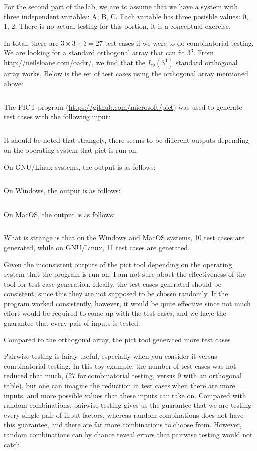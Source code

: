 For the second part of the lab, we are to assume that we have a system with
three independent variables: A, B, C. Each variable has three posisble values:
0, 1, 2. There is no actual testing for this portion, it is a conceptual
exercise.

In total, there are $3 \times 3 \times 3  = 27$ test cases if we were to do
combinatorial testing. We are looking for a standard orthogonal array that
can fit $3^3$. From \url{http://neilsloane.com/oadir/}, we find that
the $L_9(3^4)$ standard orthogonal array works. 
Below is the set of test cases using the orthogonal array mentioned above:

\inputminted{text}{resources/standard3^4}

The PICT program (\url{https://github.com/microsoft/pict}) was used to generate
test cases with the following input:

\inputminted{text}{resources/pict}

It should be noted that strangely, there seems to be different outputs
depending on the operating system that pict is run on.

On GNU/Linux systems, the output is as follows:
\inputminted{text}{resources/pictlinux}

On Windows, the output is as follows:
\inputminted{text}{resources/pictwindoze}

On MacOS, the output is as follows:
\inputminted{text}{resources/pictmacos}

What is strange is that on the Windows and MacOS systems, 10 test cases are
generated, while on GNU/Linux, 11 test cases are generated. 

Given the inconsistent outputs of the pict tool depending on the operating
system that the program is run on, I am not sure about the effectiveness of the
tool for test case generation. Ideally, the test cases generated should be
consistent, since this they are not supposed to be chosen randomly. If the
program worked consistently, however, it would be quite effective since not
much effort would be required to come up with the test cases, and we have the
guarantee that every pair of inputs is tested. 

Compared to the orthogonal array, the pict tool generated more test cases


Pairwise testing is fairly useful, especially when you consider it versus
combinatorial testing. In this toy example, the number of test cases was not
reduced that much, (27 for combinatorial testing, versus 9 with an orthogonal
table), but one can imagine the reduction in test cases when there are more
inputs, and more possible values that these inputs can take on. Compared with
random combinations, pairwise testing gives us the guarantee that we are
testing every single pair of input factors, whereas random combinations
does not have this guarantee, and there are far more combinations to choose
from. However, random combinations can by chance reveal errors that pairwise
testing would not catch.
